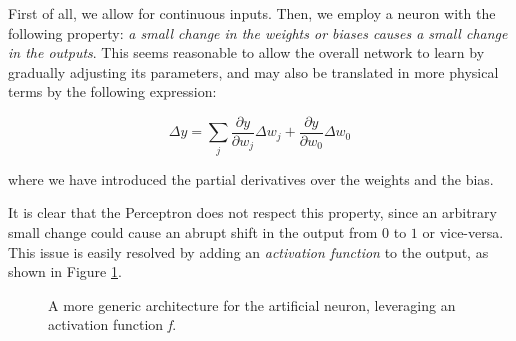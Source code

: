 First of all, we allow for continuous inputs. Then, we employ a neuron with the following property: \emph{a small change in the \emph{weights} or \emph{biases} causes a small change in the \emph{outputs}}. This seems reasonable to allow the overall network to learn by gradually adjusting its parameters, and may also be translated in more physical terms by the following expression:

\begin{equation}\label{eqn:yderiv}
  \Delta y = \sum_j \frac{\partial y}{\partial w_j}\Delta w_j + \frac{\partial y}{\partial w_0}\Delta w_0
\end{equation}



where we have introduced the partial derivatives over the weights and the bias.

It is clear that the Perceptron does not respect this property, since an arbitrary small change could cause an abrupt shift in the output from $0$ to $1$ or vice-versa. This issue is easily resolved by adding an \emph{activation function} to the output, as shown in Figure \ref{fig:artneur}.

\begin{figure}
    \centering
    
    
    \caption[Generic artificial neuron]{A more generic architecture for the artificial neuron, leveraging an activation function \emph{f}.}
    \label{fig:artneur}
\end{figure}

